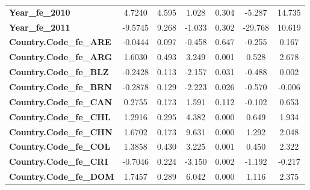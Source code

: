 \begin{center}
\begin{tabular}{lcccccc}
\textbf{Year\_fe\_2010}                                            &       4.7240  &        4.595     &     1.028  &         0.304        &       -5.287    &       14.735     \\
\textbf{Year\_fe\_2011}                                            &      -9.5745  &        9.268     &    -1.033  &         0.302        &      -29.768    &       10.619     \\
\textbf{Country.Code\_fe\_ARE}                                     &      -0.0444  &        0.097     &    -0.458  &         0.647        &       -0.255    &        0.167     \\
\textbf{Country.Code\_fe\_ARG}                                     &       1.6030  &        0.493     &     3.249  &         0.001        &        0.528    &        2.678     \\
\textbf{Country.Code\_fe\_BLZ}                                     &      -0.2428  &        0.113     &    -2.157  &         0.031        &       -0.488    &        0.002     \\
\textbf{Country.Code\_fe\_BRN}                                     &      -0.2878  &        0.129     &    -2.223  &         0.026        &       -0.570    &       -0.006     \\
\textbf{Country.Code\_fe\_CAN}                                     &       0.2755  &        0.173     &     1.591  &         0.112        &       -0.102    &        0.653     \\
\textbf{Country.Code\_fe\_CHL}                                     &       1.2916  &        0.295     &     4.382  &         0.000        &        0.649    &        1.934     \\
\textbf{Country.Code\_fe\_CHN}                                     &       1.6702  &        0.173     &     9.631  &         0.000        &        1.292    &        2.048     \\
\textbf{Country.Code\_fe\_COL}                                     &       1.3858  &        0.430     &     3.225  &         0.001        &        0.450    &        2.322     \\
\textbf{Country.Code\_fe\_CRI}                                     &      -0.7046  &        0.224     &    -3.150  &         0.002        &       -1.192    &       -0.217     \\
\textbf{Country.Code\_fe\_DOM}                                     &       1.7457  &        0.289     &     6.042  &         0.000        &        1.116    &        2.375     \\

\end{tabular}
\end{center}
